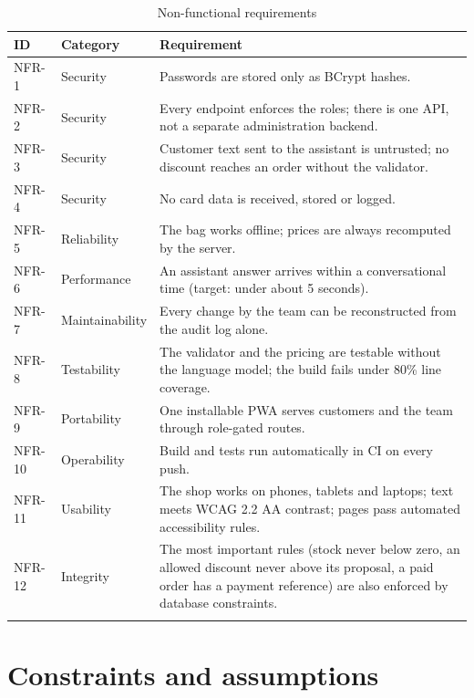 \begin{longtable}{p{1.4cm} p{2.9cm} p{9.2cm}}
	\toprule
	\textbf{ID} & \textbf{Category} & \textbf{Requirement} \\
	\midrule
	\endhead
	NFR-1 & Security & Passwords are stored only as BCrypt hashes. \\
	NFR-2 & Security & Every endpoint enforces the roles; there is one API, not a separate administration backend. \\
	NFR-3 & Security & Customer text sent to the assistant is untrusted; no discount reaches an order without the
	validator. \\
	NFR-4 & Security & No card data is received, stored or logged. \\
	NFR-5 & Reliability & The bag works offline; prices are always recomputed by the server. \\
	NFR-6 & Performance & An assistant answer arrives within a conversational time (target: under about 5 seconds). \\
	NFR-7 & Maintainability & Every change by the team can be reconstructed from the audit log alone. \\
	NFR-8 & Testability & The validator and the pricing are testable without the language model; the build fails
	under 80\% line coverage. \\
	NFR-9 & Portability & One installable PWA serves customers and the team through role-gated routes. \\
	NFR-10 & Operability & Build and tests run automatically in CI on every push. \\
	NFR-11 & Usability & The shop works on phones, tablets and laptops; text meets WCAG 2.2 AA contrast; pages pass
	automated accessibility rules. \\
	NFR-12 & Integrity & The most important rules (stock never below zero, an allowed discount never above its proposal,
	a paid order has a payment reference) are also enforced by database constraints. \\
	\bottomrule
	\caption{Non-functional requirements}
	\label{tab:nfr}
\end{longtable}

\section{Constraints and assumptions}

